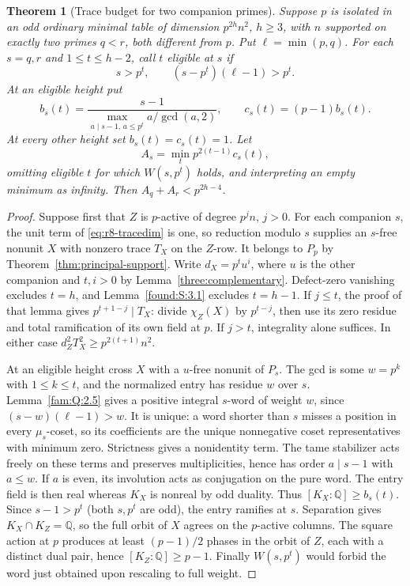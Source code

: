 \documentclass[11pt,a4paper]{article}
\numberwithin{equation}{section}
\newtheorem{theorem}{Theorem}[section]
\theoremstyle{remark}
\newcommand{\QQ}{\mathbb Q}
\begin{document}
\begin{theorem}[Trace budget for two companion primes]\label{lem:isolated-trace-budget}
Suppose $p$ is isolated in an odd ordinary minimal table of dimension
$p^{2h}n^2$, $h\ge3$, with $n$ supported on exactly two primes $q<r$,
both different from $p$. Put $\ell=\min(p,q)$. For each $s=q,r$ and
$1\le t\le h-2$, call $t$ eligible at $s$ if
\[
 s>p^t,\qquad (s-p^t)(\ell-1)>p^t .
\]
At an eligible height put
\[
 b_s(t)=\frac{s-1}{\max_{a\mid s-1,\,a\le p^t} a/\gcd(a,2)},
 \qquad c_s(t)=(p-1)b_s(t).
\]
At every other height set $b_s(t)=c_s(t)=1$. Let
\[
 A_s=\min_t p^{2(t-1)}c_s(t),
\]
omitting eligible $t$ for which $W(s,p^t)$ holds, and interpreting
an empty minimum as infinity. Then $A_q+A_r<p^{2h-4}$.
\end{theorem}
\begin{proof}
Suppose first that $Z$ is $p$-active of degree $p^jn$, $j>0$.
For each companion $s$, the unit term of \eqref{eq:r8-tracedim} is one,
so reduction modulo $s$ supplies an $s$-free nonunit $X$ with
nonzero trace $T_X$ on the $Z$-row. It belongs to $P_p$ by
Theorem~\ref{thm:principal-support}. Write $d_X=p^t u^i$, where $u$
is the other companion and $t,i>0$ by Lemma~\ref{three:complementary}.
Defect-zero vanishing excludes $t=h$, and Lemma~\ref{found:S:3.1}
excludes $t=h-1$. If $j\le t$, the proof of that lemma gives
$p^{t+1-j}\mid T_X$: divide $\chi_Z(X)$ by $p^{t-j}$, then use its
zero residue and total ramification of its own field at $p$.
If $j>t$, integrality alone suffices. In either case
$d_Z^2 T_X^2\ge p^{2(t+1)}n^2$.

At an eligible height cross $X$ with a $u$-free nonunit of $P_s$.
The gcd is some $w=p^k$ with $1\le k\le t$, and the normalized
entry has residue $w$ over $s$. Lemma~\ref{fam:Q:2.5} gives a
positive integral $s$-word of weight $w$, since
$(s-w)(\ell-1)>w$. It is unique: a word shorter than $s$ misses a
position in every $\mu_s$-coset, so its coefficients are the unique
nonnegative coset representatives with minimum zero.
Strictness gives a nonidentity term. The tame stabilizer acts freely
on these terms and preserves multiplicities, hence has order
$a\mid s-1$ with $a\le w$. If $a$ is even, its involution acts as
conjugation on the pure word. The entry field is then real whereas
$K_X$ is nonreal by odd duality. Thus $[K_X:\QQ]\ge b_s(t)$.
Since $s-1>p^t$ (both $s,p^t$ are odd), the entry ramifies at $s$.
Separation gives $K_X\cap K_Z=\QQ$, so the full orbit of $X$ agrees
on the $p$-active columns. The square action at $p$ produces at least
$(p-1)/2$ phases in the orbit of $Z$, each with a distinct dual pair,
hence $[K_Z:\QQ]\ge p-1$. Finally $W(s,p^t)$ would forbid the
word just obtained upon rescaling to full weight.


\end{proof}
\end{document}
